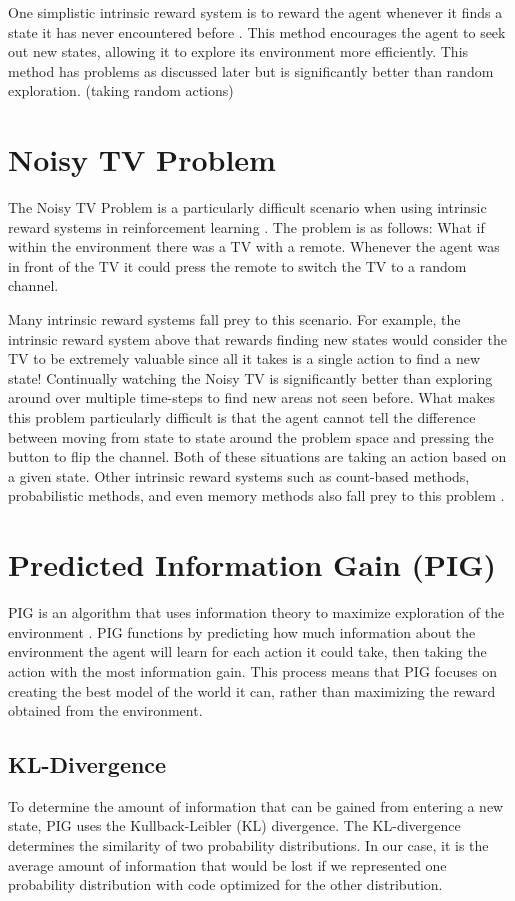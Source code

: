 \documentclass[12pt]{thesis}
\begin{document}
One simplistic intrinsic reward system is to reward the agent whenever it finds a state it has never encountered before \cite{DBLP:journals/corr/TangHFSCDSTA16}. This method encourages the agent to seek out new states, allowing it to explore its environment more efficiently. This method has problems as discussed later but is significantly better than random exploration. (taking random actions)

\section{Noisy TV Problem}
The Noisy TV Problem is a particularly difficult scenario when using intrinsic reward systems in reinforcement learning \cite{DBLP:journals/corr/abs-2008-04388}. The problem is as follows: What if within the environment there was a TV with a remote. Whenever the agent was in front of the TV it could press the remote to switch the TV to a random channel.

Many intrinsic reward systems fall prey to this scenario. For example, the intrinsic reward system above that rewards finding new states would consider the TV to be extremely valuable since all it takes is a single action to find a new state! Continually watching the Noisy TV is significantly better than exploring around over multiple time-steps to find new areas not seen before. What makes this problem particularly difficult is that the agent cannot tell the difference between moving from state to state around the problem space and pressing the button to flip the channel. Both of these situations are taking an action based on a given state. Other intrinsic reward systems such as count-based methods, probabilistic methods, and even memory methods also fall prey to this problem \cite{DBLP:journals/corr/abs-1908-06976}.

\section{Predicted Information Gain (PIG)}
PIG is an algorithm that uses information theory to maximize exploration of the environment \cite{10.3389/fncir.2013.00037}. PIG functions by predicting how much information about the environment the agent will learn for each action it could take, then taking the action with the most information gain. This process means that PIG focuses on creating the best model of the world it can, rather than maximizing the reward obtained from the environment.

\subsection{KL-Divergence}
To determine the amount of information that can be gained from entering a new state, PIG uses the Kullback-Leibler (KL) divergence. The KL-divergence determines the similarity of two probability distributions. In our case, it is the average amount of information that would be lost if we represented one probability distribution with code optimized for the other distribution.
\end{document}
